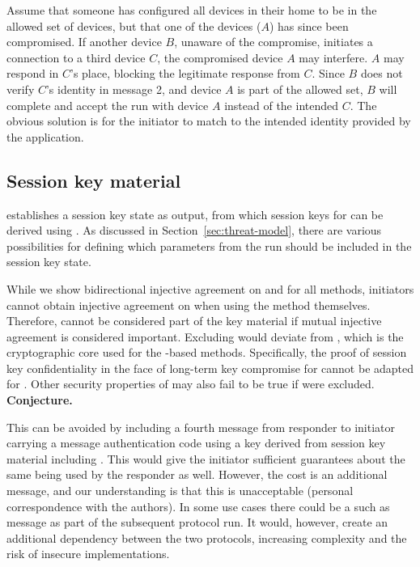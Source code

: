 \documentclass[runningheads,draft,x11names]{llncs}
\begin{document}
Assume that someone has configured all devices in their home to be in the allowed set of devices, but that one of the devices ($A$) has since been compromised. If another device $B$, unaware of the compromise, initiates a connection to a third device $C$, the compromised device $A$ may interfere. $A$ may respond in $C$'s place, blocking the legitimate response from $C$. Since $B$ does not verify $C$'s identity in message 2, and device $A$ is part of the allowed set, $B$ will complete and accept the \mEdhoc{} run with device $A$ instead of the intended $C$. The obvious solution is for the initiator to match \mIdcredr{} to the intended identity provided by the application. 

\subsection{Session key material}
\label{sec:sessionKeyMaterial}
\mEdhoc{} establishes a session key state as output, from which session keys for \mOscore{} can be derived using \mHkdf{}. As discussed in Section~\ref{sec:threat-model}, there are various possibilities for defining which parameters from the \mEdhoc{} run should be included in the session key state.

While we show bidirectional injective agreement on \mGx{} and \mGy{}
for all methods, initiators cannot obtain injective agreement on \mGiy{} when using the \mStat{} method themselves. Therefore, \mGiy{} cannot be considered part of the key material if mutual injective agreement is considered important. Excluding \mGiy{} would deviate from \mOptls{}, which is the cryptographic core used for the \mStat-based methods. Specifically, the proof of session key confidentiality in the face of long-term key compromise for \mOptls{} cannot be adapted for \mEdhoc{}. Other security properties of \mOptls{} may also fail to be true if
\mGiy{} were excluded. \textbf{Conjecture.}
%

This can be avoided by including a fourth message from responder to initiator carrying a message authentication code using a key derived from session key material including \mGiy{}. This would give the initiator sufficient guarantees about the same \mGiy{} being used by the responder as well. However, the cost is an additional message, and our understanding is that this is unacceptable (personal correspondence with the \mSpec{} authors).
%
In some use cases there could be a such as message as part of
the subsequent \mOscore{} protocol run. It would, however, create an additional dependency between the two protocols, increasing complexity and the risk of insecure implementations.
\end{document}
